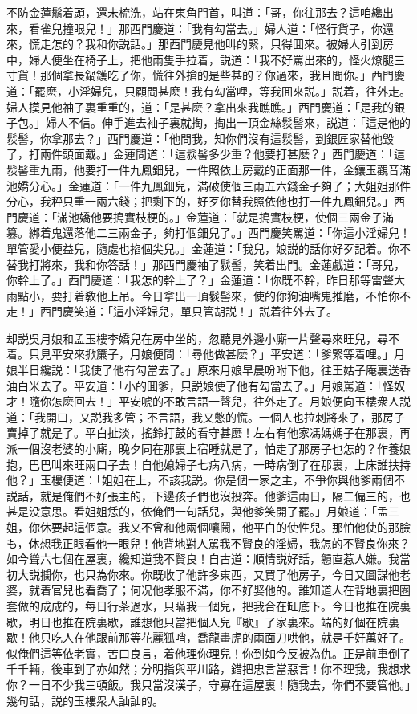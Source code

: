 不防金蓮鬅着頭，還未梳洗，站在東角門首，叫道：「哥，你往那去？這咱纔出來，看雀兒撞眼兒！」那西門慶道：「我有勾當去。」婦人道：「怪行貨子，你還來，慌走怎的？我和你説話。」那西門慶見他叫的緊，只得囬來。被婦人引到房中，婦人便坐在椅子上，把他兩隻手拉着，説道：「我不好罵出來的，怪火燎腿三寸貨！那個拿長鍋鑊吃了你，慌往外搶的是些甚的？你過來，我且問你。」西門慶道：「罷麽，小淫婦兒，只顧問甚麽！我有勾當哩，等我囬來説。」説着，往外走。婦人摸見他袖子裏重重的，道：「是甚麽？拿出來我瞧瞧。」西門慶道：「是我的銀子包。」婦人不信。伸手進去袖子裏就掏，掏出一頂金絲䯼髻來，説道：「這是他的䯼髻，你拿那去？」西門慶道：「他問我，知你們沒有這䯼髻，到銀匠家替他毀了，打兩件頭面戴。」金蓮問道：「這䯼髻多少重？他要打甚麽？」西門慶道：「這䯼髻重九兩，他要打一件九鳳鈿兒，一件照依上房戴的正面那一件，金鑲玉觀音滿池嬌分心。」金蓮道：「一件九鳳鈿兒，滿破使個三兩五六錢金子夠了；大姐姐那件分心，我秤只重一兩六錢；把剩下的，好歹你替我照依他也打一件九鳳鈿兒。」西門慶道：「滿池嬌他要搗實枝梗的。」金蓮道：「就是搗實枝梗，使個三兩金子滿篡。綁着鬼還落他二三兩金子，夠打個鈿兒了。」西門慶笑駡道：「你這小淫婦兒！單管愛小便益兒，隨處也掐個尖兒。」金蓮道：「我兒，娘説的話你好歹記着。你不替我打將來，我和你答話！」那西門慶袖了䯼髻，笑着出門。金蓮戲道：「哥兒，你幹上了。」西門慶道：「我怎的幹上了？」金蓮道：「你既不幹，昨日那等雷聲大雨點小，要打着敎他上吊。今日拿出一頂䯼髻來，使的你狗油嘴鬼推磨，不怕你不走！」西門慶笑道：「這小淫婦兒，單只管胡説！」説着往外去了。

却説吳月娘和孟玉樓李嬌兒在房中坐的，忽聽見外邊小廝一片聲尋來旺兒，尋不着。只見平安來掀簾子，月娘便問：「尋他做甚麽？」平安道：「爹緊等着哩。」月娘半日纔説：「我使了他有勾當去了。」原來月娘早晨吩咐下他，往王姑子庵裏送香油白米去了。平安道：「小的囬爹，只説娘使了他有勾當去了。」月娘罵道：「怪奴才！隨你怎麽回去！」平安唬的不敢言語一聲兒，往外走了。月娘便向玉樓衆人説道：「我開口，又説我多管；不言語，我又憋的慌。一個人也拉剌將來了，那房子賣掉了就是了。平白扯淡，搖鈴打鼓的看守甚麽！左右有他家馮媽媽子在那裏，再派一個沒老婆的小廝，晚夕同在那裏上宿睡就是了，怕走了那房子也怎的？作養娘抱，巴巴叫來旺兩口子去！自他媳婦子七病八病，一時病倒了在那裏，上床誰扶持他？」玉樓便道：「姐姐在上，不該我説。你是個一家之主，不爭你與他爹兩個不説話，就是俺們不好張主的，下邊孩子們也沒投奔。他爹這兩日，隔二偏三的，也甚是没意思。看姐姐恁的，依俺們一句話兒，與他爹笑開了罷。」月娘道：「孟三姐，你休要起這個意。我又不曾和他兩個嚷鬧，他平白的使性兒。那怕他使的那臉も，休想我正眼看他一眼兒！他背地對人駡我不賢良的淫婦，我怎的不賢良你來？如今聳六七個在屋裏，纔知道我不賢良！自古道：順情説好話，戅直惹人嫌。我當初大説攔你，也只為你來。你既收了他許多東西，又買了他房子，今日又圖謀他老婆，就着官兒也看喬了；何况他孝服不滿，你不好娶他的。誰知道人在背地裏把圈套做的成成的，每日行茶過水，只瞞我一個兒，把我合在缸底下。今日也推在院裏歇，明日也推在院裏歇，誰想他只當把個人兒『歇』了家裏來。端的好個在院裏歇！他只吃人在他跟前那等花麗狐哨，喬龍畫虎的兩面刀哄他，就是千好萬好了。似俺們這等依老實，苦口良言，着他理你理兒！你到如今反被為仇。正是前車倒了千千輛，後車到了亦如然；分明指與平川路，錯把忠言當惡言！你不理我，我想求你？一日不少我三頓飯。我只當沒漢子，守寡在這屋裏！隨我去，你們不要管他。」幾句話，説的玉樓衆人訕訕的。

